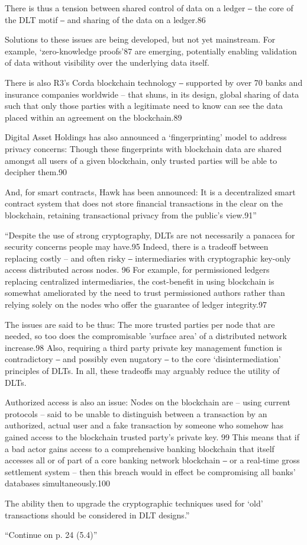 There is thus a tension between shared control of data on a ledger ‒ the core of the DLT motif ‒ and sharing of the data on a ledger.86

Solutions to these issues are being developed, but not yet mainstream. For example, ‘zero-knowledge proofs’87 are emerging, potentially enabling validation of data without visibility over the underlying data itself.

There is also R3’s Corda blockchain technology ‒ supported by over 70 banks and insurance companies worldwide – that shuns, in its design, global sharing of data such that only those parties with a legitimate need to know can see the data placed within an agreement on the blockchain.89

Digital Asset Holdings has also announced a ‘fingerprinting’ model to address privacy concerns: Though these fingerprints with blockchain data are shared amongst all users of a given blockchain, only trusted parties will be able to decipher them.90

And, for smart contracts, Hawk has been announced: It is a decentralized smart contract system that does not store financial transactions in the clear on the blockchain, retaining transactional privacy from the public’s view.91''\cite{itu2017}

``Despite the use of strong cryptography, DLTs are not necessarily a panacea for security concerns people may have.95 Indeed, there is a tradeoff between replacing costly – and often risky ‒ intermediaries with cryptographic key-only access distributed across nodes. 96 For example, for permissioned ledgers replacing centralized intermediaries, the cost-benefit in using blockchain is somewhat ameliorated by the need to trust permissioned authors rather than relying solely on the nodes who offer the guarantee of ledger integrity.97

The issues are said to be thus: The more trusted parties per node that are needed, so too does the compromisable 'surface area' of a distributed network increase.98 Also, requiring a third party private key management function is contradictory ‒ and possibly even nugatory ‒ to the core ‘disintermediation’ principles of DLTs. In all, these tradeoffs may arguably reduce the utility of DLTs.

Authorized access is also an issue: Nodes on the blockchain are – using current protocols – said to be unable to distinguish between a transaction by an authorized, actual user and a fake transaction by someone who somehow has gained access to the blockchain trusted party’s private key. 99 This means that if a bad actor gains access to a comprehensive banking blockchain that itself accesses all or of part of a core banking network blockchain ‒ or a real-time gross settlement system – then this breach would in effect be compromising all banks’ databases simultaneously.100

The ability then to upgrade the cryptographic techniques used for ‘old’ transactions should be considered in DLT designs.''\cite{itu2017}

``Continue on p. 24 (5.4)''\cite{itu2017}

